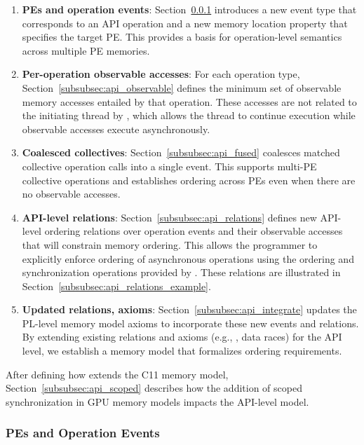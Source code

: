 \begin{enumerate}
	\item\label{mcmsteps:one} \textbf{\acp{PE} and operation events}:
	    Section~\ref{subsubsec:api_pes_operations} introduces a new event type that
	    corresponds to an API operation and a new memory location property that specifies
	    the target \ac{PE}. This provides a basis for operation-level semantics across
	    multiple \ac{PE} memories.
	\item\label{mcmsteps:two} \textbf{Per-operation observable accesses}: For each
	    operation type, Section~\ref{subsubsec:api_observable} defines the minimum set of
	    observable memory accesses entailed by that operation. These accesses are not
	    related to the initiating thread by \relSB{}, which allows the thread to continue
	    execution while observable accesses execute asynchronously.
	\item\label{mcmsteps:four} \textbf{Coalesced collectives}:
	    Section~\ref{subsubsec:api_fused} coalesces matched collective operation calls into
	    a single event. This supports multi-PE collective operations and establishes
	    ordering across \acp{PE} even when there are no observable accesses.
	\item\label{mcmsteps:three} \textbf{API-level relations}:
	    Section~\ref{subsubsec:api_relations} defines new API-level ordering relations over
	    operation events and their observable accesses that will constrain \openshmem
	    memory ordering. This allows the programmer to explicitly enforce ordering of
	    asynchronous operations using the ordering and synchronization operations provided
	    by \openshmem. These relations are illustrated in
	    Section~\ref{subsubsec:api_relations_example}.
	\item\label{mcmsteps:five} \textbf{Updated relations, axioms}:
	    Section~\ref{subsubsec:api_integrate} updates the PL-level memory model axioms to
	    incorporate these new events and relations. By extending existing relations and
	    axioms (e.g., \relHB{}, data races) for the API level, we establish a memory model
	    that formalizes \openshmem ordering requirements.
\end{enumerate}

After defining how \openshmem extends the C11 memory model,
    Section~\ref{subsubsec:api_scoped} describes how the addition of scoped
    synchronization in GPU memory models impacts the API-level model.

\subsubsection{PEs and Operation Events}\label{subsubsec:api_pes_operations}

